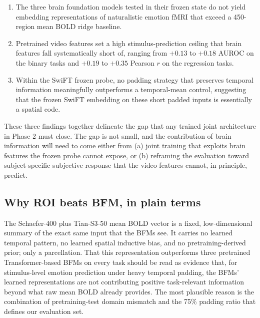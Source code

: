 \documentclass[11pt, a4paper]{article}
\begin{document}
\begin{enumerate}[leftmargin=1.4em, itemsep=2pt]
  \item The three brain foundation models tested in their frozen state do not yield
        embedding representations of naturalistic emotion fMRI that exceed a 450-region
        mean BOLD ridge baseline.
  \item Pretrained video features set a high stimulus-prediction ceiling that brain
        features fall systematically short of, ranging from $+0.13$ to $+0.18$ AUROC on
        the binary tasks and $+0.19$ to $+0.35$ Pearson $r$ on the regression tasks.
  \item Within the SwiFT frozen probe, no padding strategy that preserves temporal
        information meaningfully outperforms a temporal-mean control, suggesting that the
        frozen SwiFT embedding on these short padded inputs is essentially a spatial
        code.
\end{enumerate}

These three findings together delineate the gap that any trained joint architecture in
Phase 2 must close. The gap is not small, and the contribution of brain information will
need to come either from (a) joint training that exploits brain features the frozen probe
cannot expose, or (b) reframing the evaluation toward subject-specific subjective response
that the video features cannot, in principle, predict.

\subsection{Why ROI beats BFM, in plain terms}

The Schaefer-400 plus Tian-S3-50 mean BOLD vector is a fixed, low-dimensional summary of
the exact same input that the BFMs see. It carries no learned temporal pattern, no learned
spatial inductive bias, and no pretraining-derived prior; only a parcellation. That this
representation outperforms three pretrained Transformer-based BFMs on every task should be
read as evidence that, for stimulus-level emotion prediction under heavy temporal padding,
the BFMs' learned representations are not contributing positive task-relevant information
beyond what raw mean BOLD already provides. The most plausible reason is the combination
of pretraining-test domain mismatch and the 75\% padding ratio that defines our evaluation
set.
\end{document}
